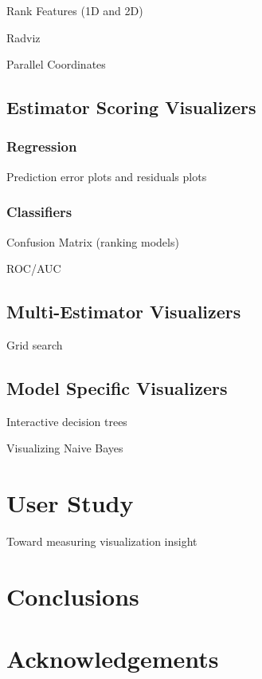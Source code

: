 \documentclass{sigkddExp}
\begin{document}
Rank Features (1D and 2D) \cite{seo_rank-by-feature_2005}

Radviz \cite{hoffman_dna_1997,hoffman_dimensional_1999}

Parallel Coordinates \cite{fua_hierarchical_1999}

\subsection{Estimator Scoring Visualizers}

\subsubsection{Regression}

Prediction error plots and residuals plots \cite{larsen_use_1972}

\subsubsection{Classifiers}

Confusion Matrix (ranking models) \cite{parker_rank_2001}

ROC/AUC \cite{hanley_meaning_1982}

\subsection{Multi-Estimator Visualizers}

Grid search \cite{bergstra_algorithms_2011}

\subsection{Model Specific Visualizers}

Interactive decision trees \cite{ankerst_visual_1999}

Visualizing Naive Bayes \cite{becker_visualizing_2001}

\section{User Study}

Toward measuring visualization insight \cite{north_toward_2006}

\section{Conclusions}

\section{Acknowledgements}




\end{document}
